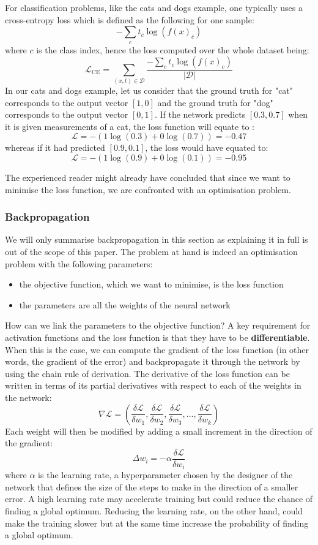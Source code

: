 For classification problems, like the cats and dogs example, one typically uses
a cross-entropy loss which is defined as the following for one sample:
$$-\sum\limits_c t_c\log(f(x)_c)$$
where $c$ is the class index, hence the loss computed over the whole dataset being:
$$\mathcal{L}_{\text{CE}} = \sum\limits_{(x, t) \in \mathcal{D}}
\frac{-\sum\limits_c t_c\log(f(x)_c)}{|\mathcal{D}|}$$
In our cats and dogs example, let us consider that the ground truth for
"cat" corresponds to the output vector $[1, 0]$ and the ground truth for "dog"
corresponds to the output vector $[0, 1]$. If the network predicts $[0.3, 0.7]$
when it is given measurements of a cat, the loss function will equate to :
$$ \mathcal{L} = -(1\log(0.3) + 0\log(0.7)) = -0.47$$
whereas if it had predicted $[0.9, 0.1]$, the loss would have equated to:
$$ \mathcal{L} = -(1\log(0.9) + 0\log(0.1)) = -0.95$$

The experienced reader might already have concluded that since we want to
minimise the loss function, we are confronted with an optimisation problem.

\subsubsection{Backpropagation}
We will only summarise backpropagation in this section as explaining it in
full is out of the scope of this paper.
The problem at hand is indeed an optimisation problem with the following
parameters:
\begin{itemize}
	\item the objective function, which we want to minimise, is the loss 
		function
	\item the parameters are all the weights of the neural network
\end{itemize}
How can we link the parameters to the objective function? A key requirement
for activation functions and the loss function is that they have to be
\textbf{differentiable}. When this is the case, we can compute the gradient
of the loss function (in other words, the gradient of the error) and 
backpropagate it through the network by using the
chain rule of derivation. The derivative of the loss function can be written
in terms of its partial derivatives with respect to each of the weights
in the network:
$$\nabla\mathcal{L} = \left(
  \frac{\delta\mathcal{L}}{\delta w_1}, 
  \frac{\delta\mathcal{L}}{\delta w_2}, 
  \frac{\delta\mathcal{L}}{\delta w_3}, ...,
  \frac{\delta\mathcal{L}}{\delta w_k}\right) 
$$
Each weight will then be modified by adding a small increment in the direction 
of the gradient:
$$ \Delta w_i = - \alpha \frac{\delta\mathcal{L}}{\delta w_i}$$
where $\alpha$ is the learning rate, a hyperparameter chosen by the designer
of the network that defines the size of the steps to make in the direction
of a smaller error. A high learning rate may accelerate training but could
reduce the chance of finding a global optimum. Reducing the learning rate,
on the other hand, could make the training slower but at the same time 
increase the probability of finding a global optimum.\\

